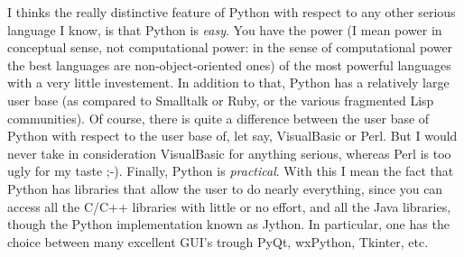 \documentclass[11pt,english]{book}
\begin{document}
I thinks the really distinctive feature of Python with respect to
any other serious language I know, is that Python is \emph{easy}. You have the 
power (I mean power in conceptual sense, not computational power: in
the sense of computational power the best languages are
non-object-oriented ones) 
of the most powerful languages with a very little investement.
In addition to that, Python has a relatively large user base 
(as compared to Smalltalk or Ruby, or the various fragmented Lisp
communities). Of course, 
there is quite a difference between the user base of Python with
respect to the user base of, let say, VisualBasic or Perl. But 
I would never take in consideration VisualBasic for anything serious, 
whereas Perl is too ugly for my taste ;-).  
Finally, Python is \emph{practical}. With this I mean the fact that 
Python has libraries that
allow the user to do nearly everything, since you can access all the C/C++ 
libraries with little or no effort, and all the Java libraries, though the
Python implementation known as Jython. In particular, one has the choice
between many excellent GUI's trough PyQt, wxPython, Tkinter, etc.
\end{document}
